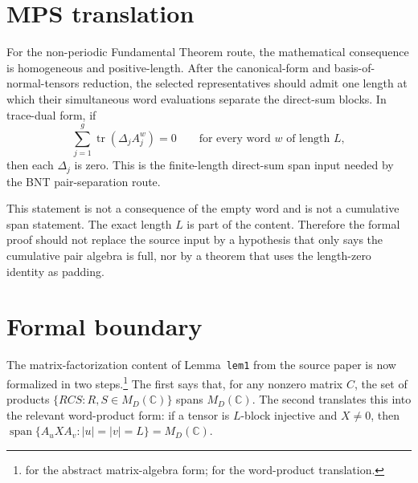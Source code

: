 \documentclass{article}
\begin{document}
\section{MPS translation}

For the non-periodic Fundamental Theorem route, the mathematical consequence is
homogeneous and positive-length. After the canonical-form and
basis-of-normal-tensors reduction, the selected representatives should admit one
length at which their simultaneous word evaluations separate the direct-sum
blocks. In trace-dual form, if
\[
  \sum_{j=1}^g \operatorname{tr}(\Delta_j A_j^w)=0
  \qquad\text{for every word } w \text{ of length } L,
\]
then each $\Delta_j$ is zero. This is the finite-length direct-sum span input
needed by the BNT pair-separation route.

This statement is not a consequence of the empty word and is not a cumulative
span statement. The exact length $L$ is part of the content. Therefore the
formal proof should not replace the source input by a hypothesis that only says
the cumulative pair algebra is full, nor by a theorem that uses the length-zero
identity as padding.

\section{Formal boundary}

The matrix-factorization content of Lemma~\texttt{lem1} from the source paper
is now formalized in two steps.\footnote{%
 for the abstract
matrix-algebra form; 
for the word-product translation.}
The first says that, for any nonzero matrix $C$, the set of products
$\{RCS : R,S\in M_D(\mathbb C)\}$ spans $M_D(\mathbb C)$. The second
translates this into the relevant word-product form: if a tensor is $L$-block
injective and $X\ne0$, then
$\operatorname{span}\{A_u X A_v : |u|=|v|=L\}=M_D(\mathbb C)$.
\end{document}
